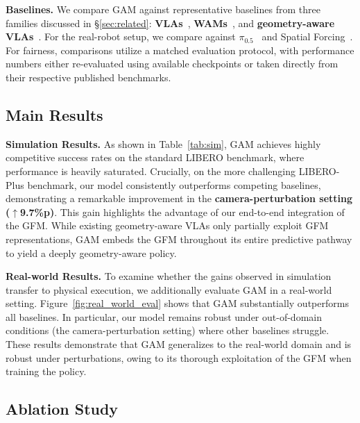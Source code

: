 \noindent\textbf{Baselines.}
We compare GAM against representative baselines from three families discussed in §\ref{sec:related}: \textbf{VLAs}~\citep{kim2024openvla, openvla_oft, black2024pi_0, pi05, pi0_fast, nora, univla, riptvla}, \textbf{WAMs}~\citep{kim2026cosmos, worldvla, yuan2026fast}, and \textbf{geometry-aware VLAs}~\citep{li2025spatial, sun2026rocket}. For the real-robot setup, we compare against $\pi_{0.5}$~\cite{pi05} and Spatial Forcing~\cite{li2025spatial}. For fairness, comparisons utilize a matched evaluation protocol, with performance numbers either re-evaluated using available checkpoints or taken directly from their respective published benchmarks.

\subsection{Main Results}
\label{sec:exp:main}

\noindent\textbf{Simulation Results.} As shown in Table~\ref{tab:sim}, GAM achieves highly competitive success rates on the standard LIBERO benchmark, where performance is heavily saturated. Crucially, on the more challenging LIBERO-Plus benchmark, our model consistently outperforms competing baselines, demonstrating a remarkable improvement in the \textbf{camera-perturbation setting ($\uparrow$9.7\%p)}. This gain highlights the advantage of our end-to-end integration of the GFM. While existing geometry-aware VLAs only partially exploit GFM representations, GAM embeds the GFM throughout its entire predictive pathway to yield a deeply geometry-aware policy.


\noindent\textbf{Real-world Results.} 
To examine whether the gains observed in simulation transfer to physical execution, we additionally evaluate GAM in a real-world setting. Figure~\ref{fig:real_world_eval} shows that GAM substantially outperforms all baselines. In particular, our model remains robust under out-of-domain conditions (the camera-perturbation setting) where other baselines struggle. These results demonstrate that GAM generalizes to the real-world domain and is robust under perturbations, owing to its thorough exploitation of the GFM when training the policy.


\subsection{Ablation Study}
\label{sec:exp:ablation}


